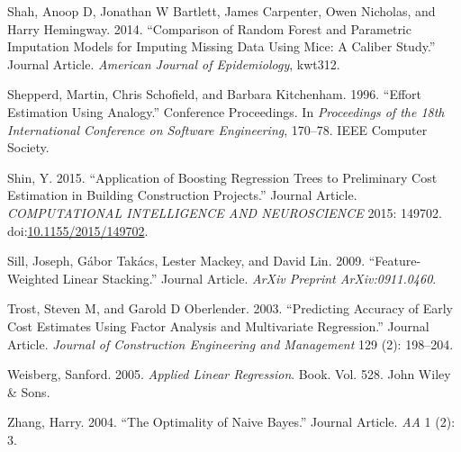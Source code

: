 \documentclass[]{elsarticle} %
\begin{document}
\hypertarget{ref-Shah2014}{}
Shah, Anoop D, Jonathan W Bartlett, James Carpenter, Owen Nicholas, and
Harry Hemingway. 2014. ``Comparison of Random Forest and Parametric
Imputation Models for Imputing Missing Data Using Mice: A Caliber
Study.'' Journal Article. \emph{American Journal of Epidemiology},
kwt312.

\hypertarget{ref-Shepperd1996}{}
Shepperd, Martin, Chris Schofield, and Barbara Kitchenham. 1996.
``Effort Estimation Using Analogy.'' Conference Proceedings. In
\emph{Proceedings of the 18th International Conference on Software
Engineering}, 170--78. IEEE Computer Society.

\hypertarget{ref-Shin2015}{}
Shin, Y. 2015. ``Application of Boosting Regression Trees to Preliminary
Cost Estimation in Building Construction Projects.'' Journal Article.
\emph{COMPUTATIONAL INTELLIGENCE AND NEUROSCIENCE} 2015: 149702.
doi:\href{https://doi.org/10.1155/2015/149702}{10.1155/2015/149702}.

\hypertarget{ref-Sill2009}{}
Sill, Joseph, Gábor Takács, Lester Mackey, and David Lin. 2009.
``Feature-Weighted Linear Stacking.'' Journal Article. \emph{ArXiv
Preprint ArXiv:0911.0460}.

\hypertarget{ref-Trost2003}{}
Trost, Steven M, and Garold D Oberlender. 2003. ``Predicting Accuracy of
Early Cost Estimates Using Factor Analysis and Multivariate
Regression.'' Journal Article. \emph{Journal of Construction Engineering
and Management} 129 (2): 198--204.

\hypertarget{ref-Weisberg2005}{}
Weisberg, Sanford. 2005. \emph{Applied Linear Regression}. Book. Vol.
528. John Wiley \& Sons.

\hypertarget{ref-Zhang2004}{}
Zhang, Harry. 2004. ``The Optimality of Naive Bayes.'' Journal Article.
\emph{AA} 1 (2): 3.
\end{document}
